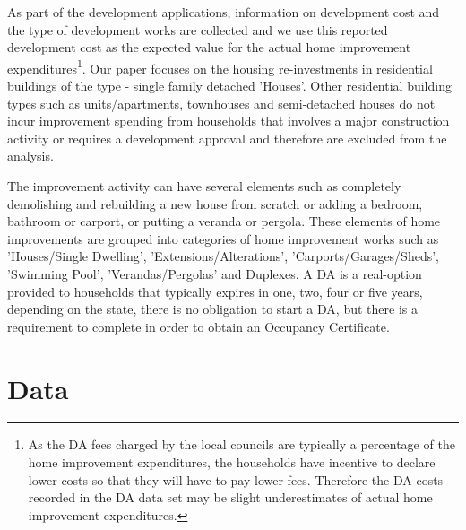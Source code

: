 \documentclass[AEJ,reqno, draftmode]{AEA} %
\begin{document}
As part of the development applications, information on development cost and the type of development works are collected and we use this reported development cost as the expected value for the actual home improvement expenditures\footnote{As the DA fees charged by the local councils are typically a percentage of the home improvement expenditures, the households have incentive to declare lower costs so that they will have to pay lower fees. Therefore the DA costs recorded in the DA data set may be slight underestimates of actual home improvement expenditures.}. Our paper focuses on the housing re-investments in residential buildings of the type - single family detached 'Houses'. Other residential building types such as units/apartments, townhouses and semi-detached houses do not incur improvement spending from households that involves a major construction activity or requires a development approval and therefore are excluded from the analysis.

The improvement activity can have several elements such as completely demolishing and rebuilding a new house from scratch or adding a bedroom, bathroom or carport, or putting a veranda or pergola. These elements of home improvements are grouped into categories of home improvement works such as 'Houses/Single Dwelling', 'Extensions/Alterations', 'Carports/Garages/Sheds', 'Swimming Pool', 'Verandas/Pergolas' and Duplexes. A DA is a real-option provided to households that typically expires in one, two, four or five years, depending on the state, there is no obligation to start a DA, but there is a requirement to complete in order to obtain an Occupancy Certificate. 



\section{Data}
\end{document}
